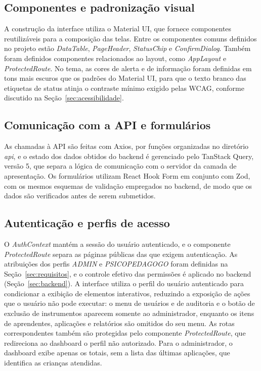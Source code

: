 \subsection{Componentes e padronização visual}

A construção da interface utiliza o Material UI, que fornece componentes reutilizáveis para a composição das telas. Entre os componentes comuns definidos no projeto estão \textit{DataTable}, \textit{PageHeader}, \textit{StatusChip} e \textit{ConfirmDialog}. Também foram definidos componentes relacionados ao layout, como \textit{AppLayout} e \textit{ProtectedRoute}. No tema, as cores de alerta e de informação foram definidas em tons mais escuros que os padrões do Material UI, para que o texto branco das etiquetas de status atinja o contraste mínimo exigido pelas WCAG, conforme discutido na Seção~\ref{sec:acessibilidade}.

\subsection{Comunicação com a API e formulários}

As chamadas à API são feitas com Axios, por funções organizadas no diretório \textit{api}, e o estado dos dados obtidos do backend é gerenciado pelo TanStack Query, versão 5, que separa a lógica de comunicação com o servidor da camada de apresentação. Os formulários utilizam React Hook Form em conjunto com Zod, com os mesmos esquemas de validação empregados no backend, de modo que os dados são verificados antes de serem submetidos.

\subsection{Autenticação e perfis de acesso}

O \textit{AuthContext} mantém a sessão do usuário autenticado, e o componente \textit{ProtectedRoute} separa as páginas públicas das que exigem autenticação. As atribuições dos perfis \textit{ADMIN} e \textit{PSICOPEDAGOGO} foram definidas na Seção~\ref{sec:requisitos}, e o controle efetivo das permissões é aplicado no backend (Seção~\ref{sec:backend}). A interface utiliza o perfil do usuário autenticado para condicionar a exibição de elementos interativos, reduzindo a exposição de ações que o usuário não pode executar: o menu de usuários e de auditoria e o botão de exclusão de instrumentos aparecem somente ao administrador, enquanto os itens de aprendentes, aplicações e relatórios são omitidos do seu menu. As rotas correspondentes também são protegidas pelo componente \textit{ProtectedRoute}, que redireciona ao dashboard o perfil não autorizado. Para o administrador, o dashboard exibe apenas os totais, sem a lista das últimas aplicações, que identifica as crianças atendidas.

